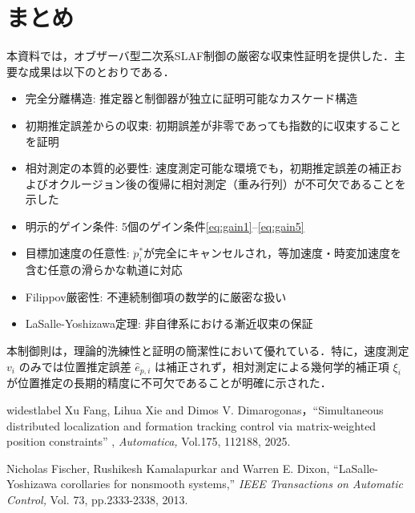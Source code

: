 \documentclass[a4paper]{jarticle}
\theoremstyle{definition}
\theoremstyle{remark}
\numberwithin{equation}{section}
\begin{document}
	\section{まとめ}
	
	本資料では，オブザーバ型二次系SLAF制御の厳密な収束性証明を提供した．主要な成果は以下のとおりである．
	
	\begin{itemize}
		\item 完全分離構造: 推定器と制御器が独立に証明可能なカスケード構造
		\item 初期推定誤差からの収束: 初期誤差が非零であっても指数的に収束することを証明
		\item 相対測定の本質的必要性: 速度測定可能な環境でも，初期推定誤差の補正およびオクルージョン後の復帰に相対測定（重み行列）が不可欠であることを示した
		\item 明示的ゲイン条件: 5個のゲイン条件\eqref{eq:gain1}--\eqref{eq:gain5}
		\item 目標加速度の任意性: $\ddot{p}_i^*$が完全にキャンセルされ，等加速度・時変加速度を含む任意の滑らかな軌道に対応
		\item Filippov厳密性: 不連続制御項の数学的に厳密な扱い
		\item LaSalle-Yoshizawa定理: 非自律系における漸近収束の保証
	\end{itemize}
	
	本制御則は，理論的洗練性と証明の簡潔性において優れている．特に，速度測定 $v_i$ のみでは位置推定誤差 $\hat{e}_{p,i}$ は補正されず，相対測定による幾何学的補正項 $\xi_i$ が位置推定の長期的精度に不可欠であることが明確に示された．
	
	\begin{thebibliography}{widestlabel}
		Xu Fang, Lihua Xie and Dimos V. Dimarogonas，``Simultaneous distributed localization and formation tracking control via matrix-weighted position constraints'' , {\it Automatica,} Vol.175, 112188, 2025.
		
		Nicholas Fischer, Rushikesh Kamalapurkar and Warren E. Dixon, ``LaSalle-Yoshizawa corollaries for nonsmooth systems,'' {\it  IEEE Transactions on Automatic Control, } Vol. 73, pp.2333-2338, 2013.
	\end{thebibliography}
	
\end{document}
